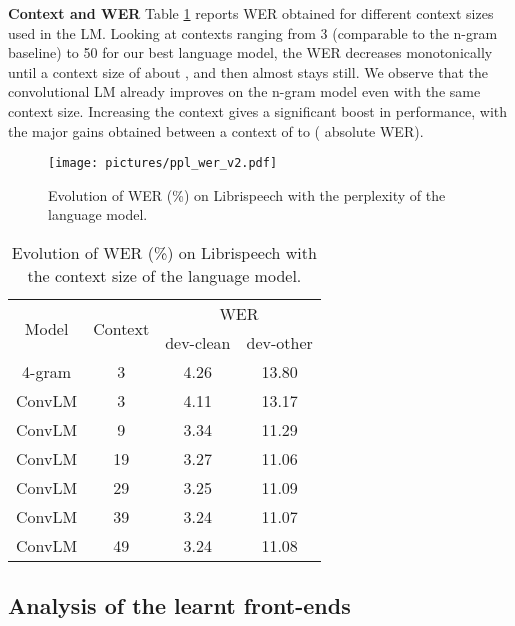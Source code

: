 \documentclass[a4paper]{article}
\begin{document}
{\bf Context and WER}
Table \ref{tab:context_wer} reports WER obtained for different context sizes used in the LM. Looking at contexts ranging from 3 (comparable to the n-gram baseline) to 50 for our best language model, the WER decreases monotonically until a context size of about , and then almost stays still. We observe that the convolutional LM already improves on the n-gram model even with the same context size. Increasing the context gives a significant boost in performance, with the major gains obtained between a context of  to  ( absolute WER).

\begin{figure}[t]
  \texttt{[image: pictures/ppl\_wer\_v2.pdf]}
  \caption{Evolution of WER (\%) on Librispeech with the perplexity of the language model.}
  \label{fig:ppl_wer}
\end{figure}


\begin{table}[t]
    \centering
    \begin{tabular}{cccc}
    \toprule
    \multirow{2}{*}{Model} & \multirow{2}{*}{Context} & \multicolumn{2}{c}{WER} \\
    \cmidrule{3-4}
                       &                          & dev-clean  & dev-other  \\
    \midrule 
    4-gram      & 3              & 4.26 & 13.80  \\
    \midrule
    ConvLM     & 3             & 4.11 & 13.17 \\
    ConvLM     & 9             & 3.34 & 11.29 \\
    ConvLM     & 19             & 3.27 & 11.06 \\
    ConvLM     & 29             & 3.25 & 11.09 \\
    ConvLM     & 39             & 3.24 & 11.07 \\
    ConvLM     & 49             & 3.24 & 11.08 \\
    \bottomrule
    \end{tabular}
  \caption{Evolution of WER (\%) on Librispeech with the context size of the language model.}
  \label{tab:context_wer}
  \vspace{-5mm}
\end{table}


\subsection{Analysis of the learnt front-ends}
\end{document}
